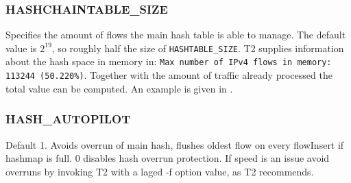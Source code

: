 \subsubsection{HASHCHAINTABLE\_SIZE}
Specifies the amount of flows the main hash table is able to manage.
The default value is $2^{19}$, so roughly half the size of {\tt HASHTABLE\_SIZE}.
T2 supplies information about the hash space in memory in: {\tt Max number of IPv4 flows in memory: 113244 (50.220\%)}.
Together with the amount of traffic already processed the total value can be computed.
An example is given in .

\subsubsection{HASH\_AUTOPILOT}\label{hash_autopilot}
Default 1. Avoids overrun of main hash, flushes oldest flow on every flowInsert if hashmap is full. 0 disables
hash overrun protection. If speed is an issue avoid overruns by invoking T2 with a laged -f option value, as T2 recommends.


